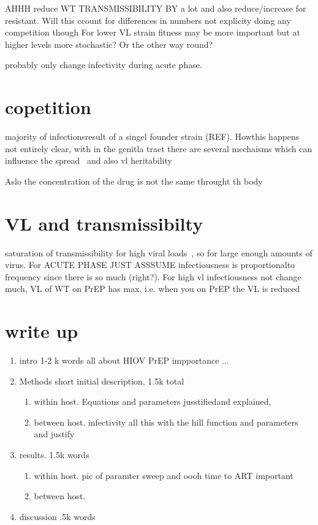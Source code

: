\documentclass[DIV=15]{scrartcl}
\begin{document}
AHHH
reduce WT TRANSMISSIBILITY BY  a lot  and also reduce/increase for resistant. Will this ccount for differences in numbers not explicity doing any competition though
For  lower VL strain fitness may be more important but at higher levels more stochastic? Or the other way round?
 
 probably only change infectivity during acute phase.
 


\section{copetition}
 majority of infectionsresult of a singel founder strain (REF). Howthis happens not entirely clear, with in the genitla tract there are several mechaisms which can influence the spread~\cite{joseph2015} and also vl heritability~\cite{fraser2014}
 
 Aslo the concentration of the drug is not the same throught th body~\cite{patterson2011}
 
 
 \section*{VL and transmissibilty}
 
saturation of transmissibility for high viral loads~\cite{fraser2007}, so for large enough amounts of virus. For  ACUTE PHASE JUST ASSSUME  	infectiousness  is  proportionalto frequency since there is  so much (right?). For  high vl infectiousness not change much, VL of WT on PrEP has max, i.e. when you on PrEP the VL is reduced 
 
 
 
 \section*{write up}
 
\begin{enumerate}
\item intro 1-2 k words all about HIOV PrEP impportance ...
\item Methods short initial description, 1.5k total
\begin{enumerate}
\item within host. Equations and parameters jusstifiedand explained,

\item between host. infectivity all  this with the hill function and parameters and justify 



\end{enumerate}

\item results. 1.5k words
\begin{enumerate}
\item within host.  pic of paramter sweep and oooh time  to ART important 


\item between host. 

\end{enumerate}
\item discussion .5k words
\end{enumerate} 
 
 

 


 
\end{document}
